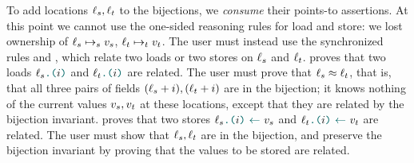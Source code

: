 To add locations $\datalangLoc_s, \datalangLoc_t$ to the bijections, we \emph{consume} their points-to assertions. At this point we cannot use the one-sided reasoning rules for load and store: we lost ownership of $\datalangLoc_s \iPointsto_s \datalangVal_s$, $\datalangLoc_t \iPointsto_t \datalangVal_t$.
%
The user must instead use the synchronized rules  and , which relate two loads or two stores on $\datalangLoc_s$ and $\datalangLoc_t$.
%
 proves that two loads $\datalangLoad{\datalangLoc_s}{\datalangIdx}$ and $\datalangLoad{\datalangLoc_t}{\datalangIdx}$ are related. The user must prove that $\datalangLoc_s \iSimilar \datalangLoc_t$, that is, that all three pairs of fields $(\datalangLoc_s + \datalangIdx), (\datalangLoc_t + \datalangIdx)$ are in the bijection; it knows nothing of the current values $\datalangVal_s, \datalangVal_t$ at these locations, except that they are related by the bijection invariant.
%
 proves that two stores $\datalangStore{\datalangLoc_s}{\datalangIdx}{\datalangVal_s}$ and $\datalangStore{\datalangLoc_t}{\datalangIdx}{\datalangVal_t}$ are related. The user must show that $\datalangLoc_s, \datalangLoc_t$ are in the bijection, and preserve the bijection invariant by proving that the values to be stored are related.


